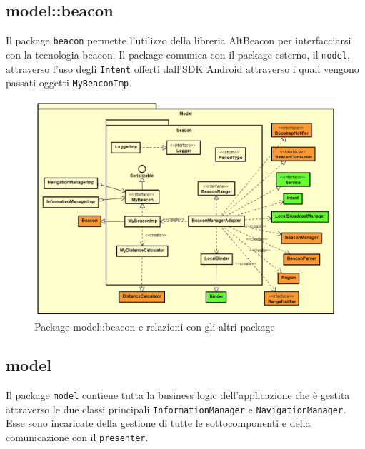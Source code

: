 \documentclass[../DefinizioneDiProdotto.tex,lanscape]{subfiles}
\begin{document}
\newpage
	\subsection{model::beacon}
		Il package \verb|beacon| permette l'utilizzo della libreria AltBeacon per interfacciarsi con la tecnologia beacon. Il package comunica con il package esterno, il \verb|model|, attraverso l'uso degli \verb|Intent| offerti dall'SDK Android attraverso i quali vengono passati oggetti \verb|MyBeaconImp|.

\begin{figure}[h]
	\includegraphics[width=\textwidth]{img/RelationPackage/beacon}
	\caption{Package model::beacon e relazioni con gli altri package}
	\label{beaconPackage}
\end{figure}


\newpage
	\subsection{model}
		Il package \verb|model| contiene tutta la business logic dell'applicazione che è gestita attraverso le due classi principali \verb|InformationManager| e \verb|NavigationManager|. Esse sono incaricate della gestione di tutte le sottocomponenti e della comunicazione con il \verb|presenter|.
\end{document}
